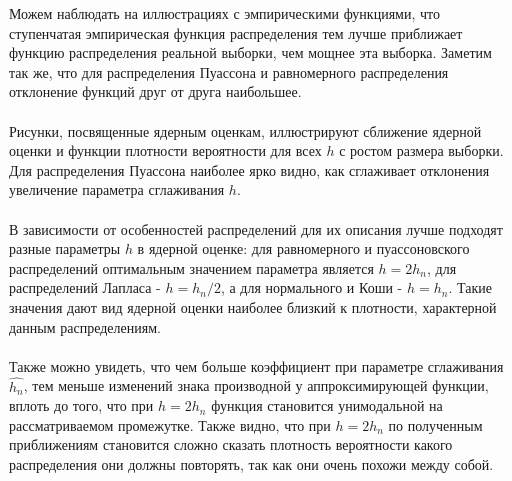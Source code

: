 \documentclass[../main.tex]{subfiles}
\begin{document}
    \noindent Можем наблюдать на иллюстрациях с эмпирическими функциями, что ступенчатая эмпирическая функция распределения тем лучше приближает функцию распределения реальной выборки, чем мощнее эта выборка. Заметим так же, что для распределения Пуассона и равномерного распределения отклонение функций друг от друга наибольшее.\\\\
    \noindent Рисунки, посвященные ядерным оценкам, иллюстрируют сближение ядерной оценки и функции плотности вероятности для всех $h$ с ростом размера выборки. Для распределения Пуассона наиболее ярко видно, как сглаживает отклонения увеличение параметра сглаживания $h$.\\\\
    \noindent В зависимости от особенностей распределений для их описания лучше подходят разные параметры $h$ в ядерной оценке: для равномерного и пуассоновского распределений оптимальным значением параметра является $h=2h_n$, для распределений Лапласа - $h=h_n/2$, а для нормального и Коши - $h = h_n$. Такие значения дают вид ядерной оценки наиболее близкий к плотности, характерной данным распределениям.\\\\
    \noindent Также можно увидеть, что чем больше коэффициент при параметре сглаживания $\hat{h_n}$, тем меньше изменений знака производной у аппроксимирующей функции, вплоть до того, что при $h=2h_n$ функция становится унимодальной на рассматриваемом промежутке. Также видно, что при $h=2h_n$ по полученным приближениям становится сложно сказать плотность вероятности какого распределения они должны повторять, так как они очень похожи между собой.
\end{document}
